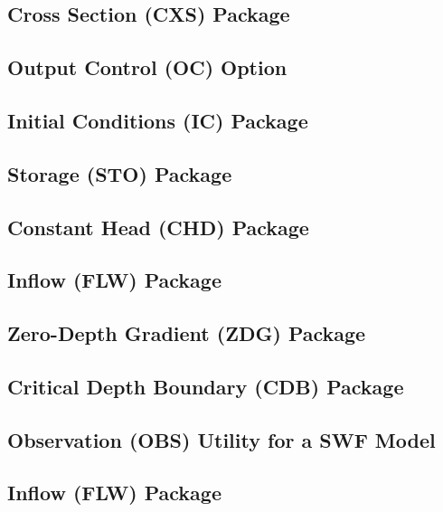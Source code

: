 \newpage
\subsection{Cross Section (CXS) Package}


\newpage
\subsection{Output Control (OC) Option}


\newpage
\subsection{Initial Conditions (IC) Package}


\newpage
\subsection{Storage (STO) Package}


\newpage
\subsection{Constant Head (CHD) Package}


\newpage
\subsection{Inflow (FLW) Package}


\newpage
\subsection{Zero-Depth Gradient (ZDG) Package}


\newpage
\subsection{Critical Depth Boundary (CDB) Package}


\newpage
\subsection{Observation (OBS) Utility for a SWF Model}


\newpage
\subsection{Inflow (FLW) Package}



